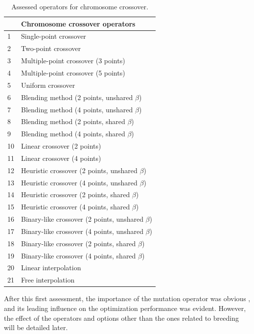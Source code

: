 \documentclass[twocol]{ametsoc}
\begin{document}
\begin{table}[htbp]
	\caption{Assessed operators for chromosome crossover.}
	\begin{center}
		\begin{tabular}{ll}
			\hline\hline  & \textbf{Chromosome crossover operators} \\ 
			\hline 
			1 & Single-point crossover \\
			2 & Two-point crossover \\
			3 & Multiple-point crossover (3 points) \\
			4 & Multiple-point crossover (5 points) \\
			5 & Uniform crossover \\
			6 & Blending method (2 points, unshared $\beta$) \\
			7 & Blending method (4 points, unshared $\beta$) \\
			8 & Blending method (2 points, shared $\beta$) \\
			9 & Blending method (4 points, shared $\beta$) \\
			10 & Linear crossover (2 points) \\
			11 & Linear crossover (4 points) \\
			12 & Heuristic crossover (2 points, unshared $\beta$) \\
			13 & Heuristic crossover (4 points, unshared $\beta$) \\
			14 & Heuristic crossover (2 points, shared $\beta$) \\
			15 & Heuristic crossover (4 points, shared $\beta$) \\
			16 & Binary-like crossover (2 points, unshared $\beta$) \\
			17 & Binary-like crossover (4 points, unshared $\beta$) \\
			18 & Binary-like crossover (2 points, shared $\beta$) \\
			19 & Binary-like crossover (4 points, shared $\beta$) \\
			20 & Linear interpolation \\
			21 & Free interpolation \\
			\hline
		\end{tabular}
	\end{center}
	\label{tab:assessed_crossover_operators}
\end{table}

After this first assessment, the importance of the mutation operator was obvious \cite[see][for the details]{Horton2012a}, and its leading influence on the optimization performance was evident. However, the effect of the operators and options other than the ones related to breeding will be detailed later.
\end{document}
